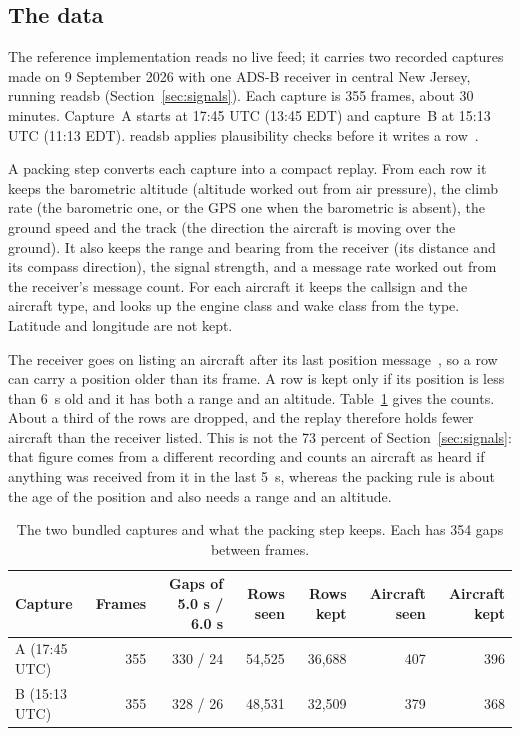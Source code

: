 \documentclass[11pt,letterpaper]{article}
\begin{document}
\subsection{The data}

The reference implementation reads no live feed; it carries two recorded captures made on 9 September 2026 with one ADS-B receiver in central New Jersey, running readsb (Section~\ref{sec:signals}). Each capture is 355 frames, about 30 minutes. Capture~A starts at 17:45 UTC (13:45 EDT) and capture~B at 15:13 UTC (11:13 EDT). readsb applies plausibility checks before it writes a row~\cite{wiedehopf2026readsb}.

A packing step converts each capture into a compact replay. From each row it keeps the barometric altitude (altitude worked out from air pressure), the climb rate (the barometric one, or the GPS one when the barometric is absent), the ground speed and the track (the direction the aircraft is moving over the ground). It also keeps the range and bearing from the receiver (its distance and its compass direction), the signal strength, and a message rate worked out from the receiver's message count. For each aircraft it keeps the callsign and the aircraft type, and looks up the engine class and wake class from the type. Latitude and longitude are not kept.

The receiver goes on listing an aircraft after its last position message~\cite{wiedehopf2026readsb}, so a row can carry a position older than its frame. A row is kept only if its position is less than 6~s old and it has both a range and an altitude. Table~\ref{tab:captures} gives the counts. About a third of the rows are dropped, and the replay therefore holds fewer aircraft than the receiver listed. This is not the 73 percent of Section~\ref{sec:signals}: that figure comes from a different recording and counts an aircraft as heard if anything was received from it in the last 5~s, whereas the packing rule is about the age of the position and also needs a range and an altitude.

\begin{table}[h]
\centering\small
\begin{tabular}{@{}lrrrrrr@{}}
\toprule
Capture & Frames & Gaps of 5.0 s / 6.0 s & Rows seen & Rows kept & Aircraft seen & Aircraft kept\\
\midrule
A (17:45 UTC) & 355 & 330 / 24 & 54,525 & 36,688 & 407 & 396\\
B (15:13 UTC) & 355 & 328 / 26 & 48,531 & 32,509 & 379 & 368\\
\bottomrule
\end{tabular}
\caption{The two bundled captures and what the packing step keeps. Each has 354 gaps between frames.}
\label{tab:captures}
\end{table}
\end{document}
